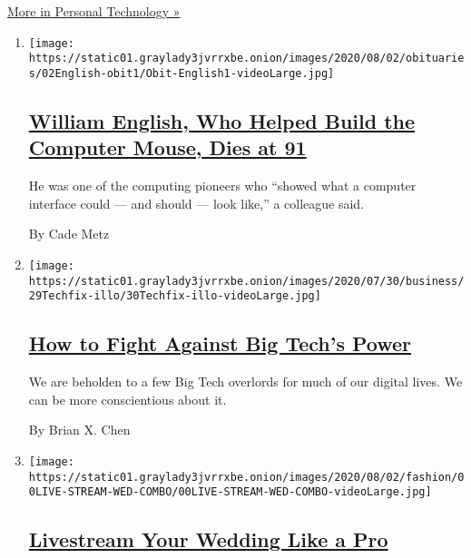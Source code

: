 \href{/section/technology/personaltech}{More in Personal Technology »}

\begin{enumerate}
\def\labelenumi{\arabic{enumi}.}
\item
  \texttt{[image: https://static01.graylady3jvrrxbe.onion/images/2020/08/02/obituaries/02English-obit1/Obit-English1-videoLarge.jpg]}

  \hypertarget{william-english-who-helped-build-the-computer-mouse-dies-at-91}{%
  \subsection{\texorpdfstring{\href{/2020/07/31/technology/william-english-who-helped-build-the-computer-mouse-dies-at-91.html}{William
  English, Who Helped Build the Computer Mouse, Dies at
  91}}{William English, Who Helped Build the Computer Mouse, Dies at 91}}\label{william-english-who-helped-build-the-computer-mouse-dies-at-91}}

  He was one of the computing pioneers who ``showed what a computer
  interface could --- and should --- look like,'' a colleague said.

  By Cade Metz
\item
  \texttt{[image: https://static01.graylady3jvrrxbe.onion/images/2020/07/30/business/29Techfix-illo/30Techfix-illo-videoLarge.jpg]}

  \hypertarget{how-to-fight-against-big-techs-power}{%
  \subsection{\texorpdfstring{\href{/2020/07/29/technology/personaltech/big-tech-power-how-to-fight.html}{How
  to Fight Against Big Tech's
  Power}}{How to Fight Against Big Tech's Power}}\label{how-to-fight-against-big-techs-power}}

  We are beholden to a few Big Tech overlords for much of our digital
  lives. We can be more conscientious about it.

  By Brian X. Chen
\item
  \texttt{[image: https://static01.graylady3jvrrxbe.onion/images/2020/08/02/fashion/00LIVE-STREAM-WED-COMBO/00LIVE-STREAM-WED-COMBO-videoLarge.jpg]}

  \hypertarget{livestream-your-wedding-like-a-pro}{%
  \subsection{\texorpdfstring{\href{/2020/07/28/fashion/weddings/livestream-your-wedding-like-a-pro.html}{Livestream
  Your Wedding Like a
  Pro}}{Livestream Your Wedding Like a Pro}}\label{livestream-your-wedding-like-a-pro}}


\end{enumerate}
